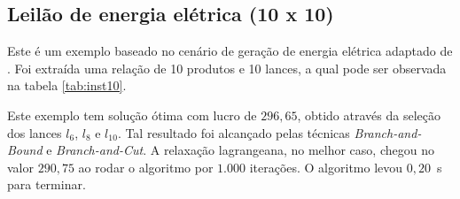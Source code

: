 \documentclass{article}
\begin{document}
	    
    \subsection{Leilão de energia elétrica (10 x 10)}
    
    Este é um exemplo baseado no cenário de geração de energia elétrica adaptado de \cite{Elisa}. Foi extraída uma relação de 10 produtos e 10 lances, a qual pode ser observada na tabela \ref{tab:inst10}.
    
    \begin{table}[h]
	    \centering
	   \caption{Leilão de energia elétrica. Na tabela principal, a ocorrência de um valor $1$ entre o lance $l_j$ e o produto $p_i$ significa que $p_i$ é selecionado por $l_j$.
	   A linha de valores especifica o ganho que a seleção de cada lance $l_j$ trás.}
        \label{tab:inst10}
    \end{table}
    
    Este exemplo tem solução ótima com lucro de $ 296{,}65 $, obtido através da seleção dos lances $ l_6 $, $ l_8 $ e $ l_{10} $. Tal resultado foi alcançado pelas técnicas \emph{Branch-and-Bound} e \emph{Branch-and-Cut}. A relaxação lagrangeana, no melhor caso, chegou no valor $ 290{,}75 $ ao rodar o algoritmo por $1.000$ iterações. O algoritmo levou $0{,}20$~s para terminar.
    
\end{document}

